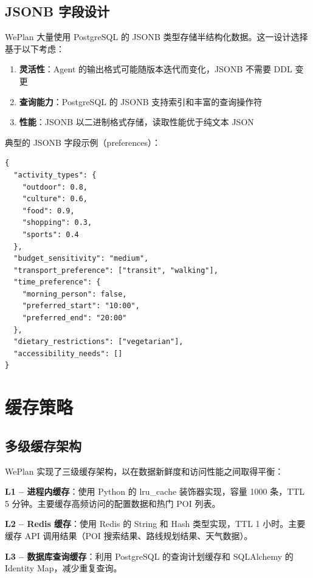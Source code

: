 \documentclass[12pt,a4paper]{ctexart}
\begin{document}
\subsection{JSONB 字段设计}

WePlan 大量使用 PostgreSQL 的 JSONB 类型存储半结构化数据。这一设计选择基于以下考虑：

\begin{enumerate}[leftmargin=2em]
  \item \textbf{灵活性}：Agent 的输出格式可能随版本迭代而变化，JSONB 不需要 DDL 变更
  \item \textbf{查询能力}：PostgreSQL 的 JSONB 支持索引和丰富的查询操作符
  \item \textbf{性能}：JSONB 以二进制格式存储，读取性能优于纯文本 JSON
\end{enumerate}

典型的 JSONB 字段示例（preferences）：

\begin{lstlisting}[caption={用户偏好 JSONB 结构},label={lst:prefs-json}]
{
  "activity_types": {
    "outdoor": 0.8,
    "culture": 0.6,
    "food": 0.9,
    "shopping": 0.3,
    "sports": 0.4
  },
  "budget_sensitivity": "medium",
  "transport_preference": ["transit", "walking"],
  "time_preference": {
    "morning_person": false,
    "preferred_start": "10:00",
    "preferred_end": "20:00"
  },
  "dietary_restrictions": ["vegetarian"],
  "accessibility_needs": []
}
\end{lstlisting}

\section{缓存策略}

\subsection{多级缓存架构}

WePlan 实现了三级缓存架构，以在数据新鲜度和访问性能之间取得平衡：

\textbf{L1 -- 进程内缓存}：使用 Python 的 lru\_cache 装饰器实现，容量 1000 条，TTL 5 分钟。主要缓存高频访问的配置数据和热门 POI 列表。

\textbf{L2 -- Redis 缓存}：使用 Redis 的 String 和 Hash 类型实现，TTL 1 小时。主要缓存 API 调用结果（POI 搜索结果、路线规划结果、天气数据）。

\textbf{L3 -- 数据库查询缓存}：利用 PostgreSQL 的查询计划缓存和 SQLAlchemy 的 Identity Map，减少重复查询。
\end{document}
